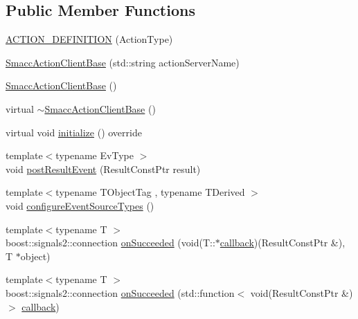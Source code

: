 \subsection*{Public Member Functions}
\begin{DoxyCompactItemize}
\item 
\hyperlink{classsmacc_1_1client__bases_1_1SmaccActionClientBase_a2936b800b46ac557550cbeda563209b3}{A\+C\+T\+I\+O\+N\+\_\+\+D\+E\+F\+I\+N\+I\+T\+I\+ON} (Action\+Type)
\item 
\hyperlink{classsmacc_1_1client__bases_1_1SmaccActionClientBase_af38f27dd26f8a87fea6b3eaa4a84e604}{Smacc\+Action\+Client\+Base} (std\+::string action\+Server\+Name)
\item 
\hyperlink{classsmacc_1_1client__bases_1_1SmaccActionClientBase_a942113f29871c3e2c3fff9e951500805}{Smacc\+Action\+Client\+Base} ()
\item 
virtual \hyperlink{classsmacc_1_1client__bases_1_1SmaccActionClientBase_aa6daf2d88aa6254e5a5c10b2c2152fad}{$\sim$\+Smacc\+Action\+Client\+Base} ()
\item 
virtual void \hyperlink{classsmacc_1_1client__bases_1_1SmaccActionClientBase_a72967f255f85e35718a1e1b0b48c38ff}{initialize} () override
\item 
{\footnotesize template$<$typename Ev\+Type $>$ }\\void \hyperlink{classsmacc_1_1client__bases_1_1SmaccActionClientBase_ad84470e029cc996685f44ad0d4062c29}{post\+Result\+Event} (Result\+Const\+Ptr result)
\item 
{\footnotesize template$<$typename T\+Object\+Tag , typename T\+Derived $>$ }\\void \hyperlink{classsmacc_1_1client__bases_1_1SmaccActionClientBase_a8d8e9c0be98ab5bf0ed666fd2fa0892b}{configure\+Event\+Source\+Types} ()
\item 
{\footnotesize template$<$typename T $>$ }\\boost\+::signals2\+::connection \hyperlink{classsmacc_1_1client__bases_1_1SmaccActionClientBase_af6d77c27d21b2e4f621f53c5f1df088b}{on\+Succeeded} (void(T\+::$\ast$\hyperlink{3_2servers_2opencv__perception__node_2opencv__perception__node_8cpp_a050e697bd654facce10ea3f6549669b3}{callback})(Result\+Const\+Ptr \&), T $\ast$object)
\item 
{\footnotesize template$<$typename T $>$ }\\boost\+::signals2\+::connection \hyperlink{classsmacc_1_1client__bases_1_1SmaccActionClientBase_a92053df4ebfd0e49bbbd4ba191bf3975}{on\+Succeeded} (std\+::function$<$ void(Result\+Const\+Ptr \&)$>$ \hyperlink{3_2servers_2opencv__perception__node_2opencv__perception__node_8cpp_a050e697bd654facce10ea3f6549669b3}{callback})

\end{DoxyCompactItemize}
